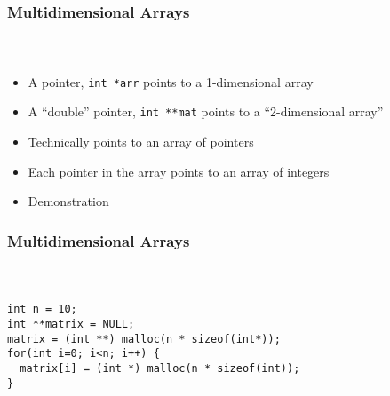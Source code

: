 \documentclass[]{beamer}
\begin{document}
\begin{frame}[fragile]
    \frametitle{Multidimensional Arrays}
    \framesubtitle{~}

\begin{itemize}[<+->]  
  \item A pointer, \texttt{int *arr} points to a 1-dimensional array
  \item A ``double'' pointer, \texttt{int **mat} points to a ``2-dimensional array''
  \item Technically points to an array of pointers
  \item Each pointer in the array points to an array of integers
  \item Demonstration
\end{itemize}

\end{frame}

\begin{frame}[fragile]
    \frametitle{Multidimensional Arrays}
    \framesubtitle{~}

\begin{verbatim}
int n = 10;
int **matrix = NULL;
matrix = (int **) malloc(n * sizeof(int*));
for(int i=0; i<n; i++) {
  matrix[i] = (int *) malloc(n * sizeof(int));
}
\end{verbatim}  

\end{frame}
\end{document}
